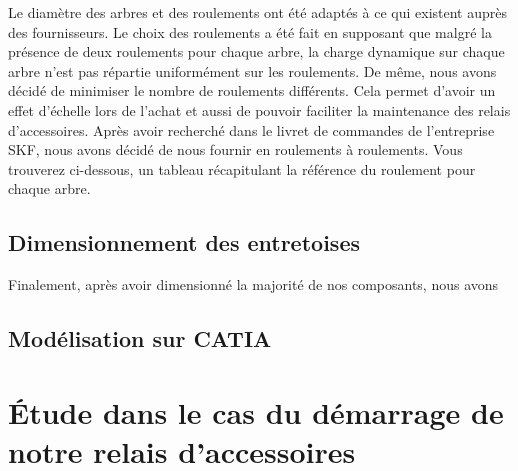 \documentclass{config}
\begin{document}
\begin{spacing}{1.2}
Le diamètre des arbres et des roulements ont été adaptés à ce qui existent auprès des fournisseurs. Le choix des roulements a été fait en supposant que malgré la présence de deux roulements pour chaque arbre, la charge dynamique sur chaque arbre n'est pas répartie uniformément sur les roulements. De même, nous avons décidé de minimiser le nombre de roulements différents. Cela permet d'avoir un effet d'échelle lors de l'achat et aussi de pouvoir faciliter la maintenance des relais d'accessoires.
Après avoir recherché dans le livret de commandes de l'entreprise SKF, nous avons décidé de nous fournir en roulements à roulements. Vous trouverez ci-dessous, un tableau récapitulant la référence du roulement pour chaque arbre.

\begin{table}[]
\centering
{}
\end{table}



\newpage
\subsection{Dimensionnement des entretoises}

Finalement, après avoir dimensionné la majorité de nos composants, nous avons 

\newpage
\subsection{Modélisation sur CATIA}


\section{Étude dans le cas du démarrage de notre relais d'accessoires}


\end{spacing}
\end{document}

